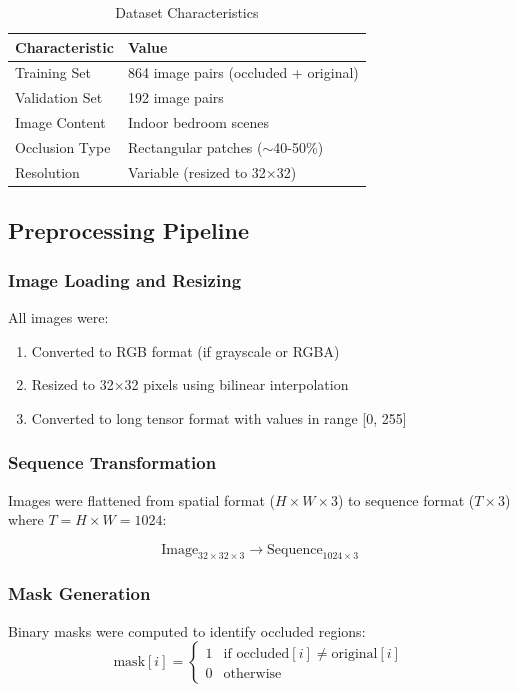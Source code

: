 \documentclass[12pt,a4paper]{article}
\begin{document}
\begin{table}[H]
\centering
\caption{Dataset Characteristics}
\begin{tabular}{@{}ll@{}}
\toprule
\textbf{Characteristic} & \textbf{Value} \\ \midrule
Training Set & 864 image pairs (occluded + original) \\
Validation Set & 192 image pairs \\
Image Content & Indoor bedroom scenes \\
Occlusion Type & Rectangular patches ($\sim$40-50\%) \\
Resolution & Variable (resized to 32×32) \\ \bottomrule
\end{tabular}
\end{table}

\subsection{Preprocessing Pipeline}

\subsubsection{Image Loading and Resizing}
All images were:
\begin{enumerate}
    \item Converted to RGB format (if grayscale or RGBA)
    \item Resized to 32×32 pixels using bilinear interpolation
    \item Converted to long tensor format with values in range [0, 255]
\end{enumerate}

\subsubsection{Sequence Transformation}
Images were flattened from spatial format ($H \times W \times 3$) to sequence format ($T \times 3$) where $T = H \times W = 1024$:

\begin{equation}
\text{Image}_{32 \times 32 \times 3} \rightarrow \text{Sequence}_{1024 \times 3}
\end{equation}

\subsubsection{Mask Generation}
Binary masks were computed to identify occluded regions:
\begin{equation}
\text{mask}[i] = \begin{cases} 
1 & \text{if } \text{occluded}[i] \neq \text{original}[i] \\
0 & \text{otherwise}
\end{cases}
\end{equation}
\end{document}
